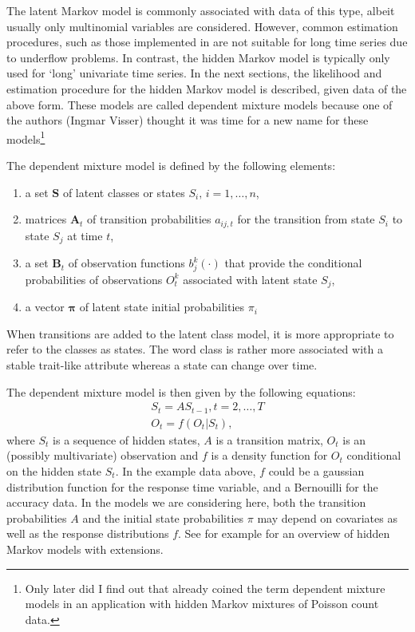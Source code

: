 \documentclass[article]{jss}
\newcommand{\vc}{\mathbf}
\newcommand{\mat}{\mathbf}
\begin{document}
The latent Markov model is commonly associated with data of this type,
albeit usually only multinomial variables are considered.  However,
common estimation procedures, such as those implemented in
\citet{Pol1996} are not suitable for long time series due to underflow
problems.  In contrast, the hidden Markov model is typically only used
for `long' univariate time series.  In the next sections, the
likelihood and estimation procedure for the hidden Markov model is
described, given data of the above form.  These models are called
dependent mixture models because one of the authors (Ingmar Visser)
thought it was time for a new name for these models\footnote{Only
later did I find out that \citet{Leroux1992} already coined the term
dependent mixture models in an application with hidden Markov mixtures
of Poisson count data.}

The dependent mixture model is defined by the following elements:
\begin{enumerate}
	
	\item a set $\vc{S}$ of latent classes or states $S_{i},\, i=1,
	\ldots , n$,
	
	\item matrices $\mat{A}_t$ of transition probabilities $a_{ij,t}$ for
	the transition from state $S_{i}$ to state $S_{j}$ at time $t$,
	
	\item a set $\vc{B}_t$ of observation functions $b_j^k(\cdot)$ that
	provide the conditional probabilities of observations $O_{t}^k$ 
	associated with latent state $S_{j}$,
	
	\item a vector $\pmb{\pi}$ of latent state initial probabilities
	$\pi_{i}$
\end{enumerate}
When transitions are added to the latent class model, it is more
appropriate to refer to the classes as states.  The word class is
rather more associated with a stable trait-like attribute whereas a
state can change over time. 

The dependent mixture model is then given by the following equations: 
\begin{align}
	S_{t} = A S_{t-1}, t=2, \ldots, T \\
	O_{t} = f(O_{t}|S_{t}),
\end{align}
where $S_{t}$ is a sequence of hidden states, $A$ is a transition
matrix, $O_{t}$ is an (possibly multivariate) observation and $f$ is a
density function for $O_{t}$ conditional on the hidden state $S_{t}$.
In the example data above, $f$ could be a gaussian distribution
function for the response time variable, and a Bernouilli for the
accuracy data.  In the models we are considering here, both the
transition probabilities $A$ and the initial state probabilities $\pi$
may depend on covariates as well as the response distributions $f$. 
See for example \citet{Fruhwirth2006} for an overview of 
hidden Markov models with extensions. 
\end{document}
